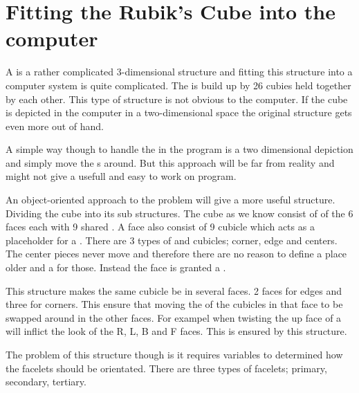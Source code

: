 \chapter{Fitting the Rubik's Cube into the computer}
A \rubik{} is a rather complicated 3-dimensional structure and fitting this structure into a computer system is quite complicated. The \rubik{} is build up by 26 cubies held together by each other. This type of structure is not obvious to the computer. If the cube is depicted in the computer in a two-dimensional space the original \rubik{} structure gets even more out of hand. 

A simple way though to handle the \rubik{} in the program is a two dimensional depiction and simply move the \facelet{}s around. But this approach will be far from reality and might not give a usefull and easy to work on program. 

An object-oriented approach to the problem will give a more useful structure. Dividing the cube into its sub structures. The cube as we know consist of of the 6 faces each with 9 shared \cpiece{}. A face also consist of 9 cubicle which acts as a placeholder for a  \cpiece{}. There are 3 types of \cpiece{} and cubicles; corner, edge and centers. The center pieces never move and therefore there are no reason to define a place older and a \cipeice{} for those. Instead the face is granted a \facelet{}.

This structure makes the same cubicle be in several faces. 2 faces for edges and three for corners. This ensure that moving the \cpiece{} of the cubicles in that face to be swapped around in the other faces. For exampel when twisting the up face of a \rubik{} will inflict the look of the R, L, B and F faces. This is ensured by this structure. 

The problem of this structure though is it requires variables to determined how the facelets should be orientated. There are three types of facelets; primary, secondary, tertiary. 

